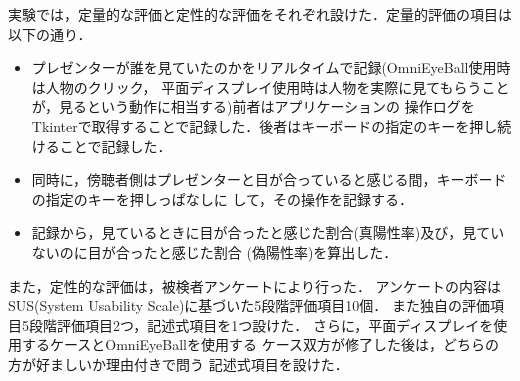 









実験では，定量的な評価と定性的な評価をそれぞれ設けた．定量的評価の項目は
以下の通り．

\begin{itemize}
  \item プレゼンターが誰を見ていたのかをリアルタイムで記録(OmniEyeBall使用時は人物のクリック，
  平面ディスプレイ使用時は人物を実際に見てもらうことが，見るという動作に相当する)前者はアプリケーションの
  操作ログをTkinterで取得することで記録した．後者はキーボードの指定のキーを押し続けることで記録した．
  \item 同時に，傍聴者側はプレゼンターと目が合っていると感じる間，キーボードの指定のキーを押しっぱなしに
  して，その操作を記録する．
  \item 記録から，見ているときに目が合ったと感じた割合(真陽性率)及び，見ていないのに目が合ったと感じた割合
  (偽陽性率)を算出した．
\end{itemize}

また，定性的な評価は，被検者アンケートにより行った．
アンケートの内容は
SUS(System Usability Scale)に基づいた5段階評価項目10個．
また独自の評価項目5段階評価項目2つ，記述式項目を1つ設けた．
さらに，平面ディスプレイを使用するケースとOmniEyeBallを使用する
ケース双方が修了した後は，どちらの方が好ましいか理由付きで問う
記述式項目を設けた．


